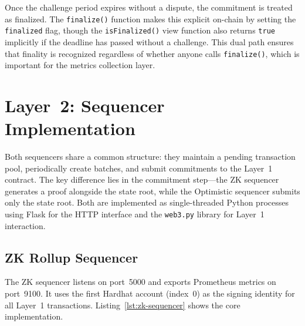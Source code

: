 Once the challenge period expires without a dispute, the commitment is treated as finalized. The \texttt{finalize()} function makes this explicit on-chain by setting the \texttt{finalized} flag, though the \texttt{isFinalized()} view function also returns \texttt{true} implicitly if the deadline has passed without a challenge. This dual path ensures that finality is recognized regardless of whether anyone calls \texttt{finalize()}, which is important for the metrics collection layer.

\section{Layer~2: Sequencer Implementation}

Both sequencers share a common structure: they maintain a pending transaction pool, periodically create batches, and submit commitments to the Layer~1 contract. The key difference lies in the commitment step---the ZK sequencer generates a proof alongside the state root, while the Optimistic sequencer submits only the state root. Both are implemented as single-threaded Python processes using Flask for the HTTP interface and the \texttt{web3.py} library for Layer~1 interaction.

\subsection{ZK Rollup Sequencer}

The ZK sequencer listens on port~5000 and exports Prometheus metrics on port~9100. It uses the first Hardhat account (index~0) as the signing identity for all Layer~1 transactions. Listing~\ref{lst:zk-sequencer} shows the core implementation.

